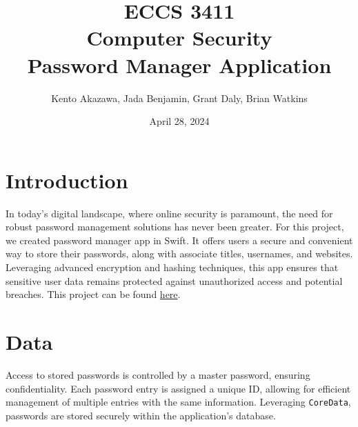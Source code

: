 \documentclass[10pt, titlepage]{article}
\title{\textbf{ECCS 3411\\Computer Security}\\Password Manager Application}
\author{Kento Akazawa, Jada Benjamin, Grant Daly, Brian Watkins}
\date{April 28, 2024}
\begin{document}
\maketitle
\newpage

\tableofcontents
\newpage

\section*{Introduction}
In today's digital landscape, where online security is paramount, the need for robust password management solutions has never been greater. For this project, we created password manager app in Swift. It offers users a secure and convenient way to store their passwords, along with associate titles, usernames, and websites. Leveraging advanced encryption and hashing techniques, this app ensures that sensitive user data remains protected against unauthorized access and potential breaches. This project can be found \href{https://github.com/k-akzw/PasswordManager.git}{here}.

\section*{Data}
Access to stored passwords is controlled by a master password, ensuring confidentiality. Each password entry is assigned a unique ID, allowing for efficient management of multiple entries with the same information. Leveraging \texttt{CoreData}, passwords are stored securely within the application's database. 
\end{document}
